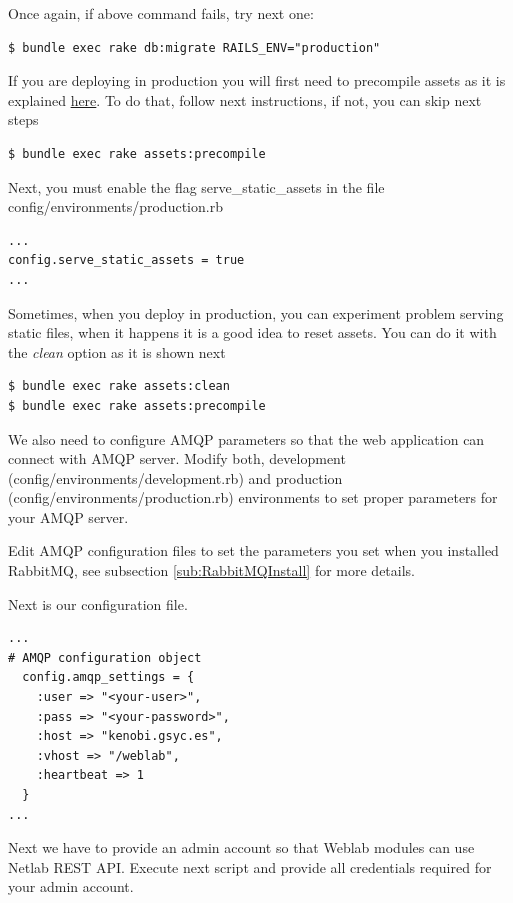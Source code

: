 \documentclass{article}
\begin{document}
Once again, if above command fails, try next one:

\begin{verbatim}
$ bundle exec rake db:migrate RAILS_ENV="production"
\end{verbatim}

If you are deploying in production you will first need to precompile assets as it is explained \href{http://guides.rubyonrails.org/asset_pipeline.html#in-production}{here}. To do that, follow next instructions, if not, you can skip next steps

\begin{verbatim}
$ bundle exec rake assets:precompile
\end{verbatim}

Next, you must enable the flag serve\_static\_assets in the file config/environments/production.rb

\begin{verbatim}
...
config.serve_static_assets = true
...
\end{verbatim}

Sometimes, when you deploy in production, you can experiment problem serving static files, when it happens it is a good idea to reset assets. You can do it with the \textit{clean} option as it is shown next

\begin{verbatim}
$ bundle exec rake assets:clean
$ bundle exec rake assets:precompile
\end{verbatim}

We also need to configure AMQP parameters so that the web application can connect with AMQP server. Modify both, development (config/environments/development.rb) and production (config/environments/production.rb) environments to set proper parameters for your AMQP server. 

Edit AMQP configuration files to set the parameters you set when you installed RabbitMQ, see subsection \ref{sub:RabbitMQInstall} for more details.

Next is our configuration file.

\begin{verbatim}
...
# AMQP configuration object
  config.amqp_settings = {
    :user => "<your-user>",
    :pass => "<your-password>",
    :host => "kenobi.gsyc.es",
    :vhost => "/weblab",
    :heartbeat => 1
  }
...
\end{verbatim}

Next we have to provide an admin account so that Weblab modules can use Netlab REST API. Execute next script and provide all credentials required for your admin account.
\end{document}
